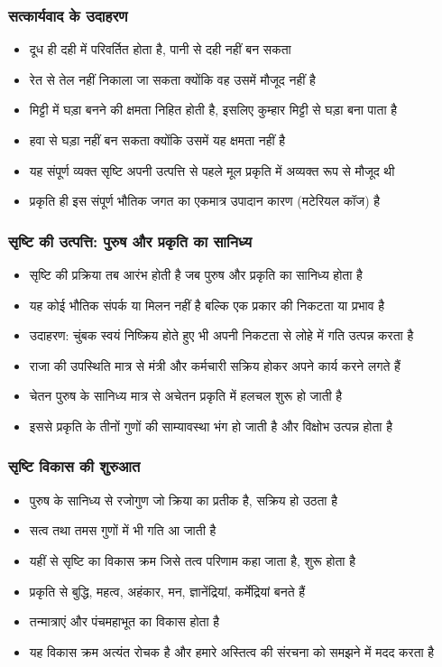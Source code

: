 \begin{frame}[fragile]\frametitle{सत्कार्यवाद के उदाहरण}
      \begin{itemize}
	\item दूध ही दही में परिवर्तित होता है, पानी से दही नहीं बन सकता
	\item रेत से तेल नहीं निकाला जा सकता क्योंकि वह उसमें मौजूद नहीं है
	\item मिट्टी में घड़ा बनने की क्षमता निहित होती है, इसलिए कुम्हार मिट्टी से घड़ा बना पाता है
	\item हवा से घड़ा नहीं बन सकता क्योंकि उसमें यह क्षमता नहीं है
	\item यह संपूर्ण व्यक्त सृष्टि अपनी उत्पत्ति से पहले मूल प्रकृति में अव्यक्त रूप से मौजूद थी
	\item प्रकृति ही इस संपूर्ण भौतिक जगत का एकमात्र उपादान कारण (मटेरियल कॉज) है
	  \end{itemize}
\end{frame}

\begin{frame}[fragile]\frametitle{सृष्टि की उत्पत्ति: पुरुष और प्रकृति का सानिध्य}
      \begin{itemize}
	\item सृष्टि की प्रक्रिया तब आरंभ होती है जब पुरुष और प्रकृति का सानिध्य होता है
	\item यह कोई भौतिक संपर्क या मिलन नहीं है बल्कि एक प्रकार की निकटता या प्रभाव है
	\item उदाहरण: चुंबक स्वयं निष्क्रिय होते हुए भी अपनी निकटता से लोहे में गति उत्पन्न करता है
	\item राजा की उपस्थिति मात्र से मंत्री और कर्मचारी सक्रिय होकर अपने कार्य करने लगते हैं
	\item चेतन पुरुष के सानिध्य मात्र से अचेतन प्रकृति में हलचल शुरू हो जाती है
	\item इससे प्रकृति के तीनों गुणों की साम्यावस्था भंग हो जाती है और विक्षोभ उत्पन्न होता है
	  \end{itemize}
\end{frame}

\begin{frame}[fragile]\frametitle{सृष्टि विकास की शुरुआत}
      \begin{itemize}
	\item पुरुष के सानिध्य से रजोगुण जो क्रिया का प्रतीक है, सक्रिय हो उठता है
	\item सत्व तथा तमस गुणों में भी गति आ जाती है
	\item यहीं से सृष्टि का विकास क्रम जिसे तत्व परिणाम कहा जाता है, शुरू होता है
	\item प्रकृति से बुद्धि, महत्व, अहंकार, मन, ज्ञानेंद्रियां, कर्मेंद्रियां बनते हैं
	\item तन्मात्राएं और पंचमहाभूत का विकास होता है
	\item यह विकास क्रम अत्यंत रोचक है और हमारे अस्तित्व की संरचना को समझने में मदद करता है
	  \end{itemize}
\end{frame}

